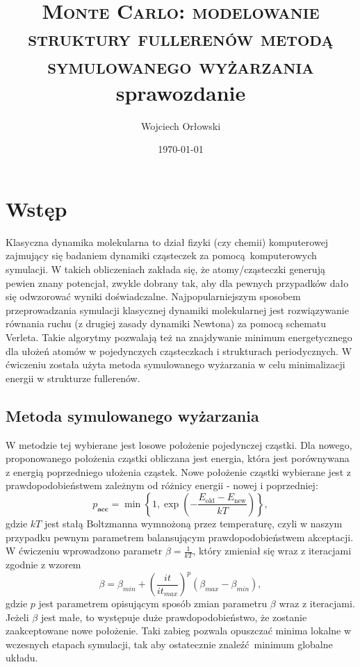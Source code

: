 \documentclass[a4paper,12pt]{article}
\author{Wojciech Orłowski}
\title{\textsc{Monte Carlo: modelowanie struktury fullerenów metodą
		symulowanego wyżarzania} \\ sprawozdanie}
\date{\today}
\begin{document}
	
	\maketitle
	
	\section*{Wstęp}
	
	Klasyczna dynamika molekularna to dział fizyki (czy chemii) komputerowej zajmujący się badaniem dynamiki cząsteczek za pomocą komputerowych symulacji.
	W takich obliczeniach zakłada się, że atomy/cząsteczki generują pewien znany potencjał, zwykle dobrany tak, aby dla pewnych przypadków dało się odwzorować wyniki doświadczalne.
	Najpopularniejszym sposobem przeprowadzania symulacji klasycznej dynamiki molekularnej jest rozwiązywanie równania ruchu (z drugiej zasady dynamiki Newtona) za pomocą schematu Verleta.
	Takie algorytmy pozwalają też na znajdywanie minimum energetycznego dla ułożeń atomów w pojedynczych cząsteczkach i strukturach periodycznych.
	W ćwiczeniu została użyta metoda symulowanego wyżarzania w celu minimalizacji energii w strukturze fullerenów. 
	
	\subsection*{Metoda symulowanego wyżarzania}
	
	W metodzie tej wybierane jest losowe położenie pojedynczej cząstki. 
	Dla nowego, proponowanego położenia cząstki obliczana jest energia, która jest porównywana z energią poprzedniego ułożenia cząstek.
	Nowe położenie cząstki wybierane jest z prawdopodobieństwem zależnym od różnicy energii - nowej i poprzedniej:
	\begin{equation}
		p_{\textbf{acc}} = \min\left\{1,\exp(- \frac{E_{\text{old}} - E_{\text{new}}}{kT})\right\},
	\end{equation}
	gdzie $kT$ jest stałą Boltzmanna wymnożoną przez temperaturę, czyli w naszym przypadku pewnym parametrem balansującym prawdopodobieństwem akceptacji.
	W ćwiczeniu wprowadzono parametr $\beta = \frac{1}{kT}$, który zmieniał się wraz z iteracjami zgodnie z wzorem
	\begin{equation}
		\beta = \beta_{min} + \left(\frac{it}{it_{max}}\right)^p (\beta_{max} - \beta_{min}),
	\end{equation}
	gdzie $p$ jest parametrem opisującym sposób zmian parametru $\beta$ wraz z iteracjami. 
	Jeżeli $\beta$ jest małe, to występuje duże prawdopodobieństwo, że zostanie zaakceptowane nowe położenie.
	Taki zabieg pozwala opuszczać minima lokalne w wczesnych etapach symulacji, tak aby ostatecznie znaleźć minimum globalne układu.
	
\end{document}
